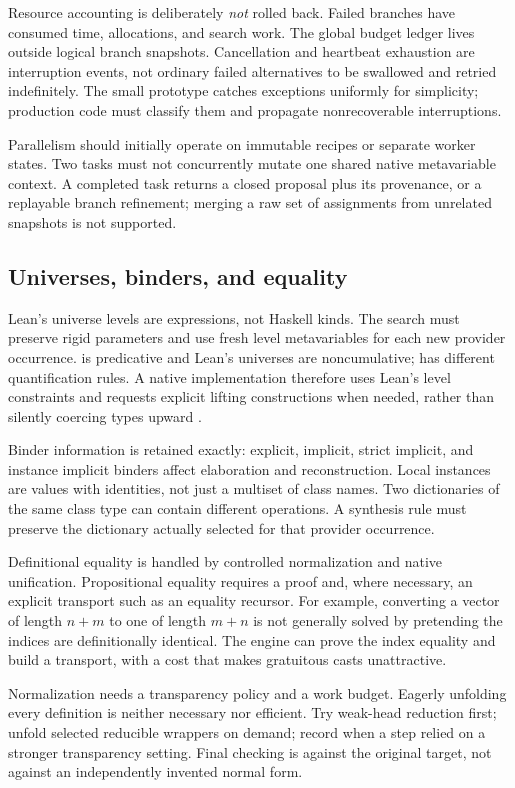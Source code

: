 Resource accounting is deliberately \emph{not} rolled back. Failed branches have consumed time, allocations, and search work. The global budget ledger lives outside logical branch snapshots. Cancellation and heartbeat exhaustion are interruption events, not ordinary failed alternatives to be swallowed and retried indefinitely. The small prototype catches exceptions uniformly for simplicity; production code must classify them and propagate nonrecoverable interruptions.

Parallelism should initially operate on immutable recipes or separate worker states. Two tasks must not concurrently mutate one shared native metavariable context. A completed task returns a closed proposal plus its provenance, or a replayable branch refinement; merging a raw set of assignments from unrelated snapshots is not supported.

\subsection{Universes, binders, and equality}

Lean's universe levels are expressions, not Haskell kinds. The search must preserve rigid parameters and use fresh level metavariables for each new provider occurrence.  is predicative and Lean's universes are noncumulative;  has different quantification rules. A native implementation therefore uses Lean's level constraints and requests explicit lifting constructions when needed, rather than silently coercing types upward \cite{lean-universes}.

Binder information is retained exactly: explicit, implicit, strict implicit, and instance implicit binders affect elaboration and reconstruction. Local instances are values with identities, not just a multiset of class names. Two dictionaries of the same class type can contain different operations. A synthesis rule must preserve the dictionary actually selected for that provider occurrence.

Definitional equality is handled by controlled normalization and native unification. Propositional equality requires a proof and, where necessary, an explicit transport such as an equality recursor. For example, converting a vector of length $n+m$ to one of length $m+n$ is not generally solved by pretending the indices are definitionally identical. The engine can prove the index equality and build a transport, with a cost that makes gratuitous casts unattractive.

Normalization needs a transparency policy and a work budget. Eagerly unfolding every definition is neither necessary nor efficient. Try weak-head reduction first; unfold selected reducible wrappers on demand; record when a step relied on a stronger transparency setting. Final checking is against the original target, not against an independently invented normal form.

